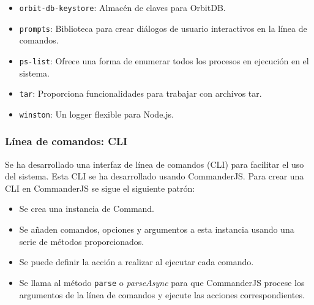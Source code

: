 \begin{itemize}[noitemsep,after=\vspace{-0.4\baselineskip}]
\begin{itemize}[noitemsep]
          \item \texttt{orbit-db-keystore}: Almacén de claves para OrbitDB.
          \item \texttt{prompts}: Biblioteca para crear diálogos de usuario interactivos en la línea de comandos.
          \item \texttt{ps-list}: Ofrece una forma de enumerar todos los procesos en ejecución en el sistema.
          \item \texttt{tar}: Proporciona funcionalidades para trabajar con archivos tar.
          \item \texttt{winston}: Un logger flexible para Node.js.
        \end{itemize}

\end{itemize}

\subsubsection{Línea de comandos: CLI}\label{sssect:cli}
Se ha desarrollado una interfaz de línea de comandos (CLI) para facilitar el uso del sistema. Esta CLI se ha desarrollado usando CommanderJS.
Para crear una CLI en CommanderJS se sigue el siguiente patrón:
\begin{itemize}[noitemsep,after=\vspace{-0.4\baselineskip}]
  \item Se crea una instancia de Command.
  \item Se añaden comandos, opciones y argumentos a esta instancia usando una serie de métodos proporcionados.
  \item Se puede definir la acción a realizar al ejecutar cada comando.
  \item Se llama al método \texttt{parse} o \textit{parseAsync} para que CommanderJS procese los argumentos de la línea de comandos y ejecute las acciones correspondientes.
\end{itemize}

